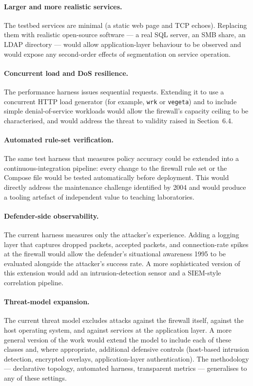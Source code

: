 \paragraph{Larger and more realistic services.} The testbed services are minimal (a static web page and TCP echoes). Replacing them with realistic open-source software --- a real SQL server, an SMB share, an LDAP directory --- would allow application-layer behaviour to be observed and would expose any second-order effects of segmentation on service operation.

\paragraph{Concurrent load and DoS resilience.} The performance harness issues sequential requests. Extending it to use a concurrent HTTP load generator (for example, \texttt{wrk} or \texttt{vegeta}) and to include simple denial-of-service workloads would allow the firewall's capacity ceiling to be characterised, and would address the threat to validity raised in Section~6.4.

\paragraph{Automated rule-set verification.} The same test harness that measures policy accuracy could be extended into a continuous-integration pipeline: every change to the firewall rule set or the Compose file would be tested automatically before deployment. This would directly address the maintenance challenge identified by \textcite{Wool}{2004} and would produce a tooling artefact of independent value to teaching laboratories.

\paragraph{Defender-side observability.} The current harness measures only the attacker's experience. Adding a logging layer that captures dropped packets, accepted packets, and connection-rate spikes at the firewall would allow the defender's situational awareness \parencite{Endsley}{1995} to be evaluated alongside the attacker's success rate. A more sophisticated version of this extension would add an intrusion-detection sensor and a SIEM-style correlation pipeline.

\paragraph{Threat-model expansion.} The current threat model excludes attacks against the firewall itself, against the host operating system, and against services at the application layer. A more general version of the work would extend the model to include each of these classes and, where appropriate, additional defensive controls (host-based intrusion detection, encrypted overlays, application-layer authentication). The methodology --- declarative topology, automated harness, transparent metrics --- generalises to any of these settings.

